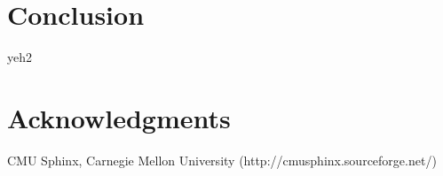 \documentclass{sigchi}
\begin{document}
\section{Conclusion}

yeh2

\section{Acknowledgments}

CMU Sphinx, Carnegie Mellon University (http://cmusphinx.sourceforge.net/)

%
%
%
%
%
\balance



\end{document}
